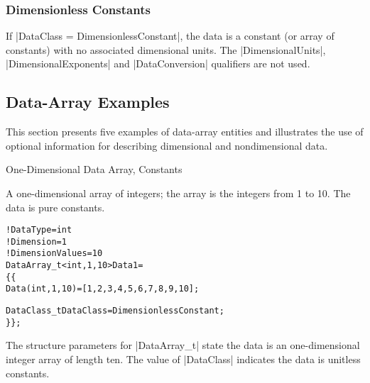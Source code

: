 \subsubsection{Dimensionless Constants}

If |DataClass = DimensionlessConstant|, the data is a constant (or array
of constants) with no associated dimensional units.  The |DimensionalUnits|,
|DimensionalExponents| and |DataConversion| qualifiers are not used.

\subsection{Data-Array Examples}
\label{s:data_example}

This section presents five examples of data-array entities and
illustrates the use of optional information for describing dimensional
and nondimensional data.

\begin{example}{One-Dimensional Data Array, Constants}
\label{ex:data1}

A one-dimensional array of integers; the array is the integers from 1 to 10.
The data is pure constants.
\begin{alltt}
  !  DataType = int
  !  Dimension = 1
  !  DimensionValues = 10
  DataArray\_t<int, 1, 10> Data1 =
    \{\{
    Data(int, 1, 10) = [1, 2, 3, 4, 5, 6, 7, 8, 9, 10] ;
    
    DataClass\_t DataClass = DimensionlessConstant ;
    \}\} ;
\end{alltt}
The structure parameters for |DataArray_t| state the data is an
one-dimensional integer array of length ten.  The value of |DataClass|
indicates the data is unitless constants.
\end{example}

